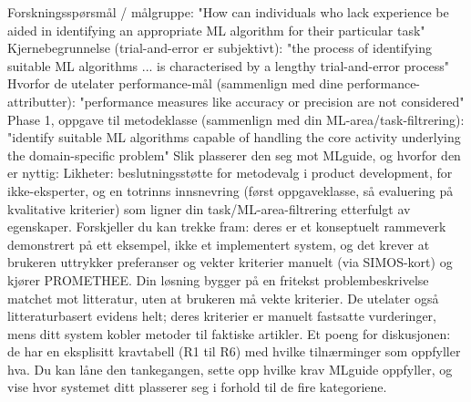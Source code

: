 Forskningsspørsmål / målgruppe:
"How can individuals who lack experience be aided in identifying an appropriate ML algorithm for their particular task"
Kjernebegrunnelse (trial-and-error er subjektivt):
"the process of identifying suitable ML algorithms ... is characterised by a lengthy trial-and-error process"
Hvorfor de utelater performance-mål (sammenlign med dine performance-attributter):
"performance measures like accuracy or precision are not considered"
Phase 1, oppgave til metodeklasse (sammenlign med din ML-area/task-filtrering):
"identify suitable ML algorithms capable of handling the core activity underlying the domain-specific problem"
Slik plasserer den seg mot MLguide, og hvorfor den er nyttig:
Likheter: beslutningsstøtte for metodevalg i product development, for ikke-eksperter, og en totrinns innsnevring (først oppgaveklasse, så evaluering på kvalitative kriterier) som ligner din task/ML-area-filtrering etterfulgt av egenskaper.
Forskjeller du kan trekke fram: deres er et konseptuelt rammeverk demonstrert på ett eksempel, ikke et implementert system, og det krever at brukeren uttrykker preferanser og vekter kriterier manuelt (via SIMOS-kort) og kjører PROMETHEE. Din løsning bygger på en fritekst problembeskrivelse matchet mot litteratur, uten at brukeren må vekte kriterier. De utelater også litteraturbasert evidens helt; deres kriterier er manuelt fastsatte vurderinger, mens ditt system kobler metoder til faktiske artikler.
Et poeng for diskusjonen: de har en eksplisitt kravtabell (R1 til R6) med hvilke tilnærminger som oppfyller hva. Du kan låne den tankegangen, sette opp hvilke krav MLguide oppfyller, og vise hvor systemet ditt plasserer seg i forhold til de fire kategoriene.





